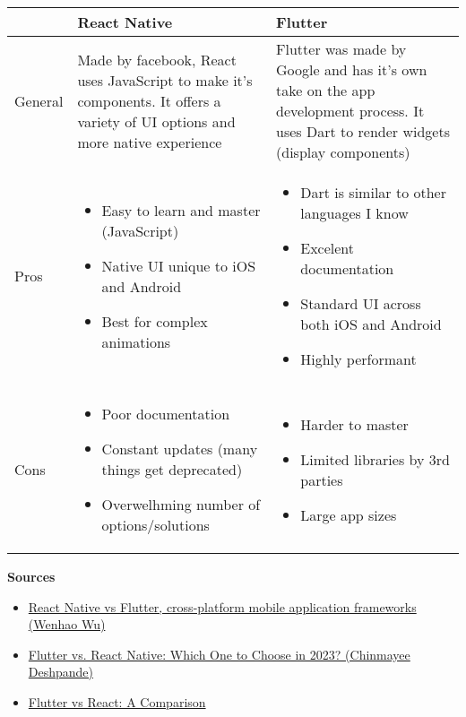 \documentclass{article}
\begin{document}
\begin{tabular}{| l | p{4.8cm} | p{4.8cm} |}  
\hline  
 & React Native & Flutter \\ \hline
General & Made by facebook, React uses JavaScript to make it's components. It offers a variety of UI options and more native experience & Flutter was made by Google and has it's own take on the app development process. It uses Dart to render widgets (display components) \\ \hline
Pros & 

\begin{itemize}
				\item Easy to learn and master (JavaScript)
				\item Native UI unique to iOS and Android
				\item Best for complex animations
\end{itemize}

& 

\begin{itemize}
				\item Dart is similar to other languages I know
				\item Excelent documentation
				\item Standard UI across both iOS and Android
				\item Highly performant
\end{itemize}

\\ \hline
Cons & 

\begin{itemize}
				\item Poor documentation
				\item Constant updates (many things get deprecated)
				\item Overwelhming number of options/solutions
\end{itemize}

& 

\begin{itemize}
				\item Harder to master
				\item Limited libraries by 3rd parties
				\item Large app sizes
\end{itemize}

\\ \hline
\end{tabular}  


\textbf{Sources}
\begin{itemize}
	\item \href{https://www.theseus.fi/bitstream/handle/10024/146232/thesis.pdf}{React Native vs Flutter, cross-platform mobile application frameworks (Wenhao Wu)}
	\item \href{https://www.simplilearn.com/tutorials/reactjs-tutorial/flutter-vs-react-native}{Flutter vs. React Native: Which One to Choose in 2023? (Chinmayee Deshpande)}
	\item \href{https://www.browserstack.com/guide/flutter-vs-react-native}{Flutter vs React: A Comparison}
\end{itemize}
\end{document}
